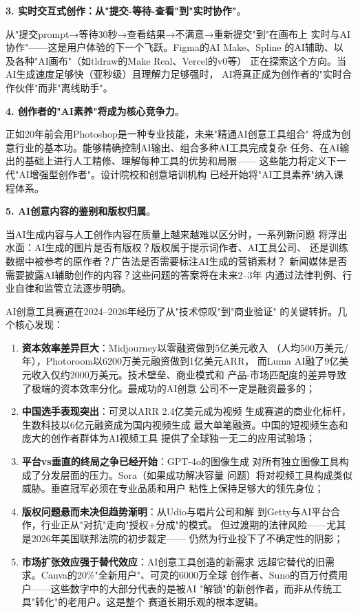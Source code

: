 \textbf{3. 实时交互式创作：从"提交-等待-查看"到"实时协作"}。

从"提交prompt→等待30秒→查看结果→不满意→重新提交"到"在画布上
实时与AI协作"——这是用户体验的下一个飞跃。Figma的AI Make、Spline
的AI辅助、以及各种"AI画布"（如tldraw的Make Real、Vercel的v0等）
正在探索这个方向。当AI生成速度足够快（亚秒级）且理解力足够强时，
AI将真正成为创作者的"实时合作伙伴"而非"离线助手"。

\textbf{4. 创作者的"AI素养"将成为核心竞争力}。

正如20年前会用Photoshop是一种专业技能，未来"精通AI创意工具组合"
将成为创意行业的基本功。能够精确控制AI输出、组合多种AI工具完成复杂
任务、在AI输出的基础上进行人工精修、理解每种工具的优势和局限——
这些能力将定义下一代"AI增强型创作者"。设计院校和创意培训机构
已经开始将"AI工具素养"纳入课程体系。

\textbf{5. AI创意内容的鉴别和版权归属}。

当AI生成内容与人工创作内容在质量上越来越难以区分时，一系列新问题
将浮出水面：AI生成的图片是否有版权？版权属于提示词作者、AI工具公司、
还是训练数据中被参考的原作者？广告法是否需要标注AI生成的营销素材？
新闻媒体是否需要披露AI辅助创作的内容？这些问题的答案将在未来2--3年
内通过法律判例、行业自律和监管立法逐步明确。

\bigskip

\begin{whybox}[本章核心洞察]
AI创意工具赛道在2024--2026年经历了从"技术惊叹"到"商业验证"
的关键转折。几个核心发现：

\begin{enumerate}[leftmargin=2em]
  \item \textbf{资本效率差异巨大}：Midjourney以零融资做到5亿美元收入
    （人均500万美元/年），Photoroom以6200万美元融资做到1亿美元ARR，
    而Luma AI融了9亿美元收入仅约2000万美元。技术壁垒、商业模式和
    产品-市场匹配度的差异导致了极端的资本效率分化。最成功的AI创意
    公司不一定是融资最多的；
  \item \textbf{中国选手表现突出}：可灵以ARR 2.4亿美元成为视频
    生成赛道的商业化标杆，生数科技以6亿元融资成为国内视频生成
    最大单笔融资。中国的短视频生态和庞大的创作者群体为AI视频工具
    提供了全球独一无二的应用试验场；
  \item \textbf{平台vs垂直的终局之争已经开始}：GPT-4o的图像生成
    对所有独立图像工具构成了分发层面的压力。Sora（如果成功解决容量
    问题）将对视频工具构成类似威胁。垂直冠军必须在专业品质和用户
    粘性上保持足够大的领先身位；
  \item \textbf{版权问题悬而未决但趋势渐明}：从Udio与唱片公司和解
    到Getty与AI平台合作，行业正从"对抗"走向"授权+分成"的模式。
    但过渡期的法律风险——尤其是2026年美国联邦法院的初步裁定——
    仍然为行业投下了不确定性的阴影；
  \item \textbf{市场扩张效应强于替代效应}：AI创意工具创造的新需求
    远超它替代的旧需求。Canva的20\%"全新用户"、可灵的6000万全球
    创作者、Suno的百万付费用户——这些数字中的大部分代表的是被AI
    "解锁"的新创作者，而非从传统工具"转化"的老用户。这是整个
    赛道长期乐观的根本逻辑。
\end{enumerate}
\end{whybox}

